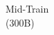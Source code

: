\documentclass[preview]{standalone}
\begin{document}
\begin{center}
Mid-Train\\(300B)
\end{center}
\end{document}
